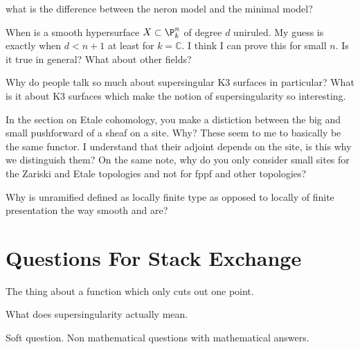 \documentclass[12pt]{article}
\begin{document}
\begin{exercise}
what is the difference between the neron model and the minimal model?
\end{exercise}

\begin{exercise}
When is a smooth hypersurface $X \subset \P^n_k$ of degree $d$ uniruled. My guess is exactly when $d < n + 1$ at least for $k = \mathbb{C}$. I think I can prove this for small $n$. Is it true in general? What about other fields? 
\end{exercise}

\begin{exercise}
Why do people talk so much about supersingular K3 surfaces in particular? What is it about K3 surfaces which make the notion of supersingularity so interesting. 
\end{exercise}

\begin{exercise}
In the section on Etale cohomology, you make a distiction between the big and small pushforward of a sheaf on a site. Why? These seem to me to basically be the same functor. I understand that their adjoint depends on the site, is this why we distinguish them? On the same note, why do you only consider small sites for the Zariski and Etale topologies and not for fppf and other topologies?
\end{exercise}

\begin{exercise}
Why is unramified defined as locally finite type as opposed to locally of finite presentation the way smooth and \etale are?
\end{exercise}

\section{Questions For Stack Exchange}

\begin{exercise}
The thing about a function which only cuts out one point.
\end{exercise}

\begin{exercise}
What does supersingularity actually mean.
\end{exercise}

\begin{exercise}
Soft question. Non mathematical questions with mathematical answers. 
\end{exercise}
\end{document}
